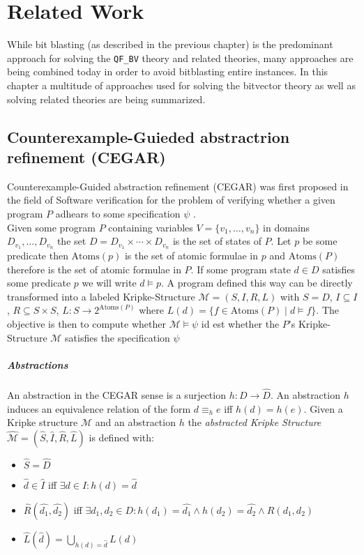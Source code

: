 \chapter{Related Work}
\label{ch:related_work}
While bit blasting (as described in the previous chapter) is the predominant approach for solving the \texttt{QF\_BV} theory and related theories, many approaches are being combined today in order to avoid bitblasting entire instances.
In this chapter a multitude of approaches used for solving the bitvector theory as well as solving related theories are being summarized. 

\section{Counterexample-Guieded abstractrion refinement (CEGAR)}
Counterexample-Guided abstraction refinement (CEGAR) was first proposed in the field of Software verification for the problem of verifying whether a given program $P$ adhears to some specification $\psi$ \cite{CEGAR}.\\
Given some program $P$ containing variables $V=\{v_1,\dots,v_n\}$ in domains $D_{v_1},\dots,D_{v_n}$ the set $D=D_{v_1}\times\dotsi\times D_{v_n}$ is the set of states of $P$. Let $p$ be some predicate then $\text{Atoms}\left(p\right)$ is the set of atomic formulae in $p$ and $\text{Atoms}\left(P\right)$ therefore is the set of atomic formulae in $P$. If some program state $d\in D$ satisfies some predicate $p$ we will write $d\vDash p$. A program defined this way can be directly transformed into a labeled Kripke-Structure $\mathcal{M}=\left(S,I,R,L\right)$ with $S=D$, $I\subseteq I$, $R \subseteq S \times S$, $L\colon S \to 2^{\text{Atoms}\left(P\right)}$ where $L\left(d\right) = \{ f \in \text{Atoms}\left(P\right) \mid d \vDash f \}$. The objective is then to compute whether $\mathcal{M}\vDash\psi$ id est whether the $P$'s Kripke-Structure $\mathcal{M}$ satisfies the specification $\psi$
\paragraph{Abstractions}
An abstraction in the CEGAR sense is a surjection $h\colon D \to \hat{D}$. An abstraction $h$ induces an equivalence relation of the form $d \equiv_h e$ iff $h\left(d\right) = h\left(e\right)$. Given a Kripke structure $\mathcal{M}$ and an abstraction $h$ the \textit{abstracted Kripke Structure} $\hat{\mathcal{M}} = \left(\hat{S},\hat{I},\hat{R},\hat{L}\right)$ is defined with:
\begin{itemize}
    \item $\hat{S} = \hat{D}$
    \item $\hat{d} \in \hat{I}$ iff $\exists d \in I\colon h\left(d\right) = \hat{d}$
    \item $\hat{R}\left(\hat{d_1},\hat{d_2}\right)$ iff $\exists d_1,d_2 \in D\colon h\left(d_1\right) = \hat{d_1} \land h\left(d_2\right) = \hat{d_2} \land R\left(d_1, d_2\right)$
    \item $\hat{L}\left(\hat{d}\right)=\bigcup\limits_{h\left(d\right)=\hat{d}} L\left(d\right)$
\end{itemize}

